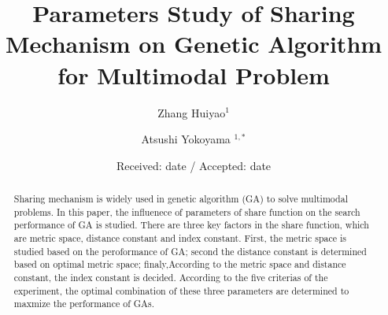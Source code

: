 \documentclass[smallextended]{svjour3}       %
\begin{document}
\title{Parameters Study of Sharing Mechanism on Genetic Algorithm for Multimodal Problem}
\author{Zhang Huiyao$^1$  \and
	Atsushi Yokoyama $^{1,*}$
}
\date{Received: date / Accepted: date}
\maketitle

\begin{abstract}
    Sharing mechanism is widely used in genetic algorithm (GA) to solve
    multimodal problems.  In this paper, the influenece of parameters of share
    function on the search performance of GA is studied. There are three key
    factors in the share function, which are metric space, distance constant and
    index constant. First, the metric space is studied based on the peroformance
    of GA; second the distance constant is determined based on optimal metric
    space; finaly,According to the metric space and distance constant, the index
    constant is decided. According to the five criterias of the experiment, the
    optimal combination of these three parameters are determined to maxmize the
    performance of GAs.
\end{abstract}
\end{document}
